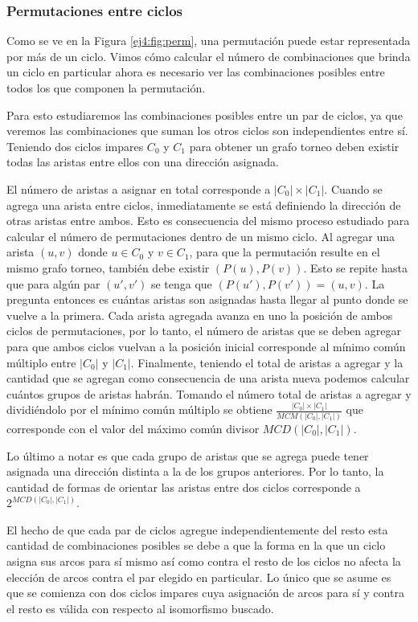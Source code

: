 \subsubsection{Permutaciones entre ciclos} \label{ej4:sec:paresciclos}

Como se ve en la Figura \ref{ej4:fig:perm}, una permutación puede estar
representada por más de un ciclo. Vimos cómo calcular el número de combinaciones
que brinda un ciclo en particular ahora es necesario ver las combinaciones
posibles entre todos los que componen la permutación.

Para esto estudiaremos las combinaciones posibles entre un par de ciclos, ya que
veremos las combinaciones que suman los otros ciclos son independientes entre
sí. Teniendo dos ciclos impares $C_0$ y $C_1$ para obtener un grafo torneo deben
existir todas las aristas entre ellos con una dirección asignada.

El número de aristas a asignar en total corresponde a $|C_0| \times |C_1|$.
Cuando se agrega una arista entre ciclos, inmediatamente se está definiendo la
dirección de otras aristas entre ambos. Esto es consecuencia del mismo proceso
estudiado para calcular el número de permutaciones dentro de un mismo ciclo. Al
agregar una arista $(u, v)$ donde $u \in C_0$ y $v \in C_1$, para que la
permutación resulte en el mismo grafo torneo, también debe existir $(P(u),
P(v))$. Esto se repite hasta que para algún par $(u', v')$ se tenga que $(P(u'),
P(v')) = (u, v)$. La pregunta entonces es cuántas aristas son asignadas hasta
llegar al punto donde se vuelve a la primera. Cada arista agregada avanza en uno la
posición de ambos ciclos de permutaciones, por lo tanto, el número de aristas
que se deben agregar para que ambos ciclos vuelvan a la posición inicial
corresponde al mínimo común múltiplo entre $|C_0|$ y $|C_1|$. Finalmente,
teniendo el total de aristas a agregar y la cantidad que se agregan como
consecuencia de una arista nueva podemos calcular cuántos grupos de aristas
habrán. Tomando el número total de aristas a agregar y dividiéndolo por el mínimo común
múltiplo se obtiene $\frac{|C_0| \times |C_1|}{MCM(|C_0|, |C_1|)}$ que
corresponde con el valor del máximo común divisor $MCD(|C_0|, |C_1|)$.

Lo último a notar es que cada grupo de aristas que se agrega puede tener
asignada una dirección distinta a la de los grupos anteriores. Por lo tanto, la
cantidad de formas de orientar las aristas entre dos ciclos corresponde a
$2^{MCD(|C_0|, |C_1|)}$.

El hecho de que cada par de ciclos agregue independientemente del resto esta
cantidad de combinaciones posibles se debe a que la forma en la que un ciclo
asigna sus arcos para sí mismo así como contra el resto de los ciclos no afecta
la elección de arcos contra el par elegido en particular. Lo único que se asume
es que se comienza con dos ciclos impares cuya asignación de arcos para sí y
contra el resto es válida con respecto al isomorfismo buscado.

